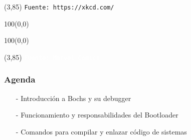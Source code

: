 \documentclass[aspectratio=169]{beamer}
\begin{document}
\begin{frame}[plain]
\begin{textblock}{60}
{    }
    \end{textblock}
    \begin{textblock}{55}(3,85)
    \scriptsize
    \texttt{Fuente: https://xkcd.com/}
    \end{textblock}
\end{frame}

\begin{frame}[plain]
    \begin{textblock}{100}(0,0)
    \end{textblock}
    \begin{textblock}{100}(0,0)
    \end{textblock}
    \begin{textblock}{55}(3,85)
    \scriptsize
    \textcolor{white}{\texttt{Fuente: Marvel Comics}}
    \end{textblock}
\end{frame}

\begin{frame}
    \frametitle{Agenda}
    \begin{itemize}\setlength\itemsep{2em}
     \item[-] Introducción a Bochs y su debugger
     \item[-] Funcionamiento y responsabilidades del Bootloader
     \item[-] Comandos para compilar y enlazar código de sistemas
    \end{itemize}
\end{frame}
\end{document}
